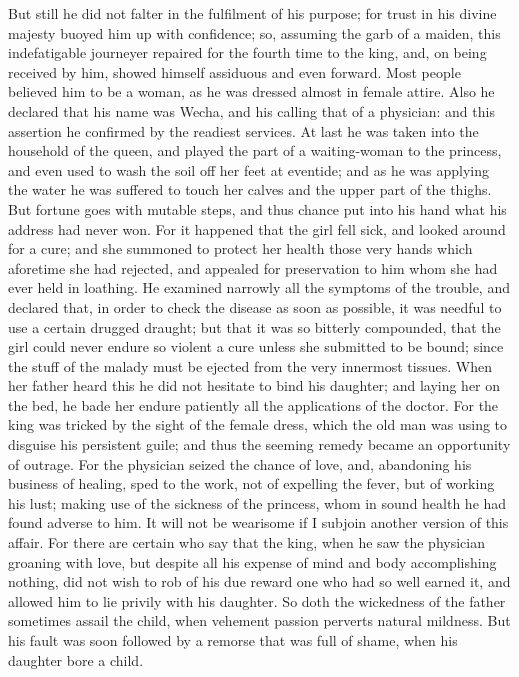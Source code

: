 \documentclass[10pt,a4paper]{report}
\begin{document}
But still he did not falter in the fulfilment of his purpose; for trust in his divine majesty buoyed him up with confidence; so, assuming the garb of a maiden, this indefatigable journeyer repaired for the fourth time to the king, and, on being received by him, showed himself assiduous and even forward. Most people believed him to be a woman, as he was dressed almost in female attire. Also he declared that his name was Wecha, and his calling that of a physician: and this assertion he confirmed by the readiest services. At last he was taken into the household of the queen, and played the part of a waiting-woman to the princess, and even used to wash the soil off her feet at eventide; and as he was applying the water he was suffered to touch her calves and the upper part of the thighs. But fortune goes with mutable steps, and thus chance put into his hand what his address had never won. For it happened that the girl fell sick, and looked around for a cure; and she summoned to protect her health those very hands which aforetime she had rejected, and appealed for preservation to him whom she had ever held in loathing. He examined narrowly all the symptoms of the trouble, and declared that, in order to check the disease as soon as possible, it was needful to use a certain drugged draught; but that it was so bitterly compounded, that the girl could never endure so violent a cure unless she submitted to be bound; since the stuff of the malady must be ejected from the very innermost tissues. When her father heard this he did not hesitate to bind his daughter; and laying her on the bed, he bade her endure patiently all the applications of the doctor. For the king was tricked by the sight of the female dress, which the old man was using to disguise his persistent guile; and thus the seeming remedy became an opportunity of outrage. For the physician seized the chance of love, and, abandoning his business of healing, sped to the work, not of expelling the fever, but of working his lust; making use of the sickness of the princess, whom in sound health he had found adverse to him. It will not be wearisome if I subjoin another version of this affair. For there are certain who say that the king, when he saw the physician groaning with love, but despite all his expense of mind and body accomplishing nothing, did not wish to rob of his due reward one who had so well earned it, and allowed him to lie privily with his daughter. So doth the wickedness of the father sometimes assail the child, when vehement passion perverts natural mildness. But his fault was soon followed by a remorse that was full of shame, when his daughter bore a child.\\
\end{document}
